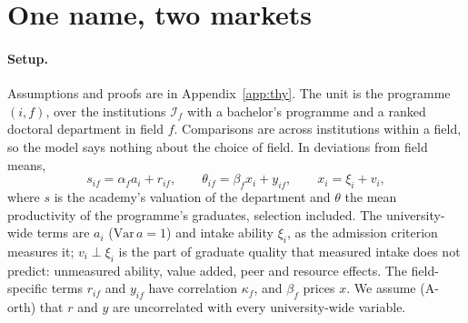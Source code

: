 \documentclass[11pt]{article}
\begin{document}
\section{One name, two markets}\label{sec:thy}

\paragraph{Setup.} Assumptions and proofs are in Appendix~\ref{app:thy}. The unit is the programme $(i,f)$,
over the institutions $\mathcal I_f$ with a bachelor's programme and a ranked doctoral department in field $f$.
Comparisons are across institutions within a field, so the model says nothing about the choice of field. In
deviations from field means,
\begin{equation}\label{eq:thy-latent}
s_{if}=\alpha_fa_i+r_{if},\qquad \theta_{if}=\beta_fx_i+y_{if},\qquad x_i=\xi_i+v_i,
\end{equation}
where $s$ is the academy's valuation of the department and $\theta$ the mean productivity of the programme's
graduates, selection included. The university-wide terms are $a_i$ ($\mathrm{Var}\,a=1$) and intake ability $\xi_i$,
as the admission criterion measures it; $v_i\perp\xi_i$ is the part of graduate quality that measured intake does not
predict: unmeasured ability, value added, peer and resource effects. The field-specific terms $r_{if}$ and $y_{if}$
have correlation $\kappa_f$, and $\beta_f$ prices $x$. We assume (A-orth) that $r$ and $y$ are uncorrelated with
every university-wide variable.
\end{document}
